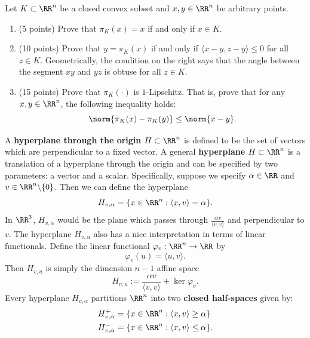 \documentclass[11pt]{article}
\begin{document}
\begin{prob} 
    Let $K \subset \RR^n$ be a closed convex subset and $x, y \in \RR^n$ be arbitrary points. 
    \begin{enumerate}[label = (\alph*)]
        \item (5 points) Prove that $\pi_K(x) = x$ if and only if $x \in K$. 
        \item (10 points) Prove that $y = \pi_K(x)$ if and only if $\langle x - y, z - y \rangle \leq 0$ for all $z \in K$. Geometrically, the condition on the right says that the angle between the segment $xy$ and $yz$ is obtuse for all $z \in K$.
        \item (15 points) Prove that $\pi_K(\cdot)$ is $1$-Lipschitz. That is, prove that for any $x, y \in \RR^n$, the following inequality holds:
        \[
            \norm{\pi_K(x) - \pi_K(y)} \leq \norm{x-y}. 
        \]
    \end{enumerate}
\end{prob}

A \textbf{hyperplane through the origin} $H \subset \RR^n$ is defined to be the set of vectors which are perpendicular to a fixed vector. A general \textbf{hyperplane} $H \subset \RR^n$ is a translation of a hyperplane through the origin and can be specified by two parameters: a vector and a scalar. Specifically, suppose we specify $\alpha \in \RR$ and $v \in \RR^n \backslash \{0\}$. Then we can define the hyperplane
\[
    H_{v, \alpha} = \{x \in \RR^n : \langle x, v \rangle = \alpha \}.
\]
In $\RR^3$, $H_{v, \alpha}$ would be the plane which passes through $ \frac{\alpha v}{\langle v, v \rangle}$ and perpendicular to $v$. The hyperplane $H_{v, \alpha}$ also has a nice interpretation in terms of linear functionals. Define the linear functional $\varphi_v : \RR^n \to \RR$ by
\[
    \varphi_{v} (u) = \langle u, v \rangle.
\] 
Then $H_{v, u}$ is simply the dimension $n-1$ affine space 
\[
    H_{v, u} := \frac{\alpha v}{\langle v, v \rangle} + \ker \varphi_v.
\]
Every hyperplane $H_{v, \alpha}$ partitions $\RR^n$ into two \textbf{closed half-spaces} given by:
\begin{align*}
    H_{v, \alpha}^+ & = \{x \in \RR^n : \langle x, v \rangle \geq \alpha \} \\
    H_{v, \alpha}^- & = \{x \in \RR^n : \langle x, v \rangle \leq \alpha \}.
\end{align*}
\end{document}
